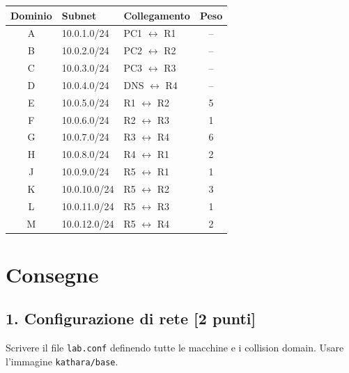 \documentclass[a4paper,11pt]{article}
\begin{document}
\begin{center}
    \begin{tabular}{cllc}
        \toprule
        \textbf{Dominio} & \textbf{Subnet} & \textbf{Collegamento}    & \textbf{Peso} \\
        \midrule
        A                & 10.0.1.0/24     & PC1 $\leftrightarrow$ R1 & --            \\
        B                & 10.0.2.0/24     & PC2 $\leftrightarrow$ R2 & --            \\
        C                & 10.0.3.0/24     & PC3 $\leftrightarrow$ R3 & --            \\
        D                & 10.0.4.0/24     & DNS $\leftrightarrow$ R4 & --            \\
        E                & 10.0.5.0/24     & R1 $\leftrightarrow$ R2  & 5             \\
        F                & 10.0.6.0/24     & R2 $\leftrightarrow$ R3  & 1             \\
        G                & 10.0.7.0/24     & R3 $\leftrightarrow$ R4  & 6             \\
        H                & 10.0.8.0/24     & R4 $\leftrightarrow$ R1  & 2             \\
        J                & 10.0.9.0/24     & R5 $\leftrightarrow$ R1  & 1             \\
        K                & 10.0.10.0/24    & R5 $\leftrightarrow$ R2  & 3             \\
        L                & 10.0.11.0/24    & R5 $\leftrightarrow$ R3  & 1             \\
        M                & 10.0.12.0/24    & R5 $\leftrightarrow$ R4  & 2             \\
        \bottomrule
    \end{tabular}
\end{center}

\section*{Consegne}

\subsection*{1. Configurazione di rete [2 punti]}

Scrivere il file \texttt{lab.conf} definendo tutte le macchine e i collision domain. Usare l'immagine \texttt{kathara/base}.
\end{document}
